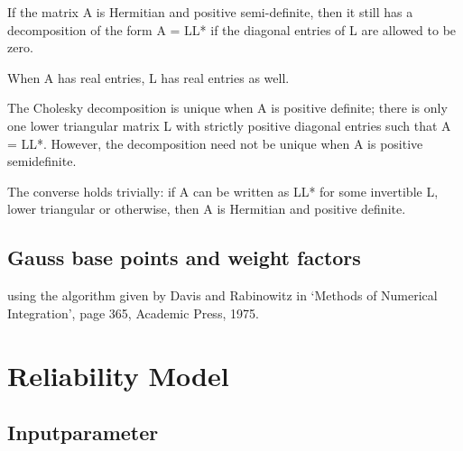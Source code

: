 \documentclass[letterpaper,10pt,english]{sphinxmanual}
\begin{document}
If the matrix A is Hermitian and positive semi-definite, then it still has a
decomposition of the form A = LL* if the diagonal entries of L are allowed to
be zero.

When A has real entries, L has real entries as well.

The Cholesky decomposition is unique when A is positive definite; there is
only one lower triangular matrix L with strictly positive diagonal entries
such that A = LL*. However, the decomposition need not be unique when A is
positive semidefinite.

The converse holds trivially: if A can be written as LL* for some invertible
L, lower triangular or otherwise, then A is Hermitian and positive definite.


\section{Gauss base points and weight factors}
\label{theory:gauss-base-points-and-weight-factors}
using the algorithm given by Davis and Rabinowitz in `Methods of Numerical
Integration', page 365, Academic Press, 1975.


\chapter{Reliability Model}
\label{model:chap-model}\label{model::doc}\label{model:reliability-model}

\section{Inputparameter}
\label{model:module-pyre.model}\label{model:inputparameter}
\end{document}
